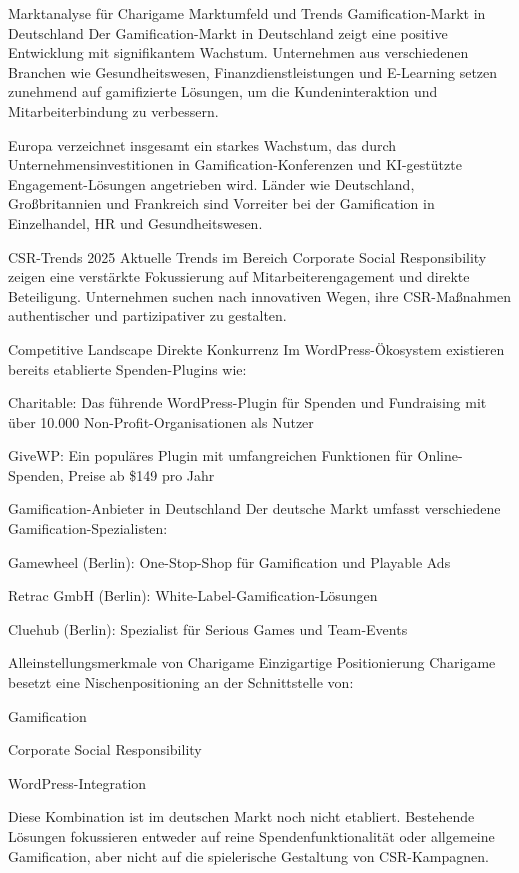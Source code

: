 Marktanalyse für Charigame
Marktumfeld und Trends
Gamification-Markt in Deutschland
Der Gamification-Markt in Deutschland zeigt eine positive Entwicklung mit signifikantem Wachstum. Unternehmen aus verschiedenen Branchen wie Gesundheitswesen, Finanzdienstleistungen und E-Learning setzen zunehmend auf gamifizierte Lösungen, um die Kundeninteraktion und Mitarbeiterbindung zu verbessern.

Europa verzeichnet insgesamt ein starkes Wachstum, das durch Unternehmensinvestitionen in Gamification-Konferenzen und KI-gestützte Engagement-Lösungen angetrieben wird. Länder wie Deutschland, Großbritannien und Frankreich sind Vorreiter bei der Gamification in Einzelhandel, HR und Gesundheitswesen.

CSR-Trends 2025
Aktuelle Trends im Bereich Corporate Social Responsibility zeigen eine verstärkte Fokussierung auf Mitarbeiterengagement und direkte Beteiligung. Unternehmen suchen nach innovativen Wegen, ihre CSR-Maßnahmen authentischer und partizipativer zu gestalten.

Competitive Landscape
Direkte Konkurrenz
Im WordPress-Ökosystem existieren bereits etablierte Spenden-Plugins wie:

Charitable: Das führende WordPress-Plugin für Spenden und Fundraising mit über 10.000 Non-Profit-Organisationen als Nutzer

GiveWP: Ein populäres Plugin mit umfangreichen Funktionen für Online-Spenden, Preise ab \$149 pro Jahr

Gamification-Anbieter in Deutschland
Der deutsche Markt umfasst verschiedene Gamification-Spezialisten:

Gamewheel (Berlin): One-Stop-Shop für Gamification und Playable Ads

Retrac GmbH (Berlin): White-Label-Gamification-Lösungen

Cluehub (Berlin): Spezialist für Serious Games und Team-Events

Alleinstellungsmerkmale von Charigame
Einzigartige Positionierung
Charigame besetzt eine Nischenpositioning an der Schnittstelle von:

Gamification

Corporate Social Responsibility

WordPress-Integration

Diese Kombination ist im deutschen Markt noch nicht etabliert. Bestehende Lösungen fokussieren entweder auf reine Spendenfunktionalität oder allgemeine Gamification, aber nicht auf die spielerische Gestaltung von CSR-Kampagnen.

